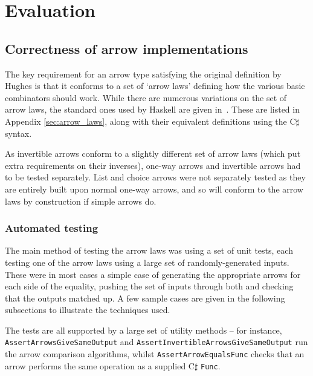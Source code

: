 \documentclass[12pt,twoside,notitlepage]{report}
\begin{document}
\cleardoublepage



\chapter{Evaluation}

\section{Correctness of arrow implementations}

The key requirement for an arrow type satisfying the original definition by Hughes is that it conforms to a set of `arrow laws' defining how the various basic combinators should work. While there are numerous variations on the set of arrow laws, the standard ones used by Haskell are given in~\cite{haskell_wiki_arrows}. These are listed in Appendix \ref{sec:arrow_laws}, along with their equivalent definitions using the C$\sharp$ syntax.

As invertible arrows conform to a slightly different set of arrow laws (which put extra requirements on their inverses), one-way arrows and invertible arrows had to be tested separately. List and choice arrows were not separately tested as they are entirely built upon normal one-way arrows, and so will conform to the arrow laws by construction if simple arrows do.


\subsection{Automated testing}

The main method of testing the arrow laws was using a set of unit tests, each testing one of the arrow laws using a large set of randomly-generated inputs. These were in most cases a simple case of generating the appropriate arrows for each side of the equality, pushing the set of inputs through both and checking that the outputs matched up. A few sample cases are given in the following subsections to illustrate the techniques used.

The tests are all supported by a large set of utility methods -- for instance, \texttt{AssertArrowsGiveSameOutput} and \texttt{AssertInvertibleArrowsGiveSameOutput} run the arrow comparison algorithms, whilst \texttt{AssertArrowEqualsFunc} checks that an arrow performs the same operation as a supplied C$\sharp$ \texttt{Func}.
\end{document}
